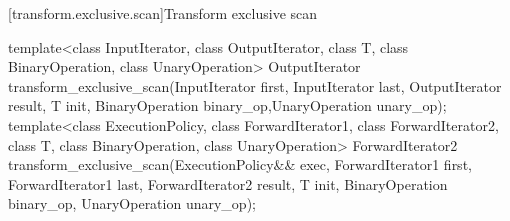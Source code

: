 [transform.exclusive.scan]{Transform exclusive scan}

%
\begin{itemdecl}
template<class InputIterator, class OutputIterator, class T,
         class BinaryOperation, class UnaryOperation>
  OutputIterator transform_exclusive_scan(InputIterator first, InputIterator last,
                                          OutputIterator result, T init,
                                          BinaryOperation binary_op,UnaryOperation unary_op);
template<class ExecutionPolicy,
         class ForwardIterator1, class ForwardIterator2, class T,
         class BinaryOperation, class UnaryOperation>
  ForwardIterator2 transform_exclusive_scan(ExecutionPolicy&& exec,
                                            ForwardIterator1 first, ForwardIterator1 last,
                                            ForwardIterator2 result, T init,
                                            BinaryOperation binary_op, UnaryOperation unary_op);
\end{itemdecl}


